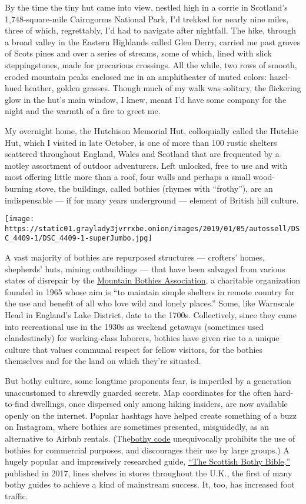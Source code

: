 By the time the tiny hut came into view, nestled high in a corrie in
Scotland's 1,748-square-mile Cairngorms National Park, I'd trekked for
nearly nine miles, three of which, regrettably, I'd had to navigate
after nightfall. The hike, through a broad valley in the Eastern
Highlands called Glen Derry, carried me past groves of Scots pines and
over a series of streams, some of which, lined with slick
steppingstones, made for precarious crossings. All the while, two rows
of smooth, eroded mountain peaks enclosed me in an amphitheater of muted
colors: hazel-hued heather, golden grasses. Though much of my walk was
solitary, the flickering glow in the hut's main window, I knew, meant
I'd have some company for the night and the warmth of a fire to greet
me.

My overnight home, the Hutchison Memorial Hut, colloquially called the
Hutchie Hut, which I visited in late October, is one of more than 100
rustic shelters scattered throughout England, Wales and Scotland that
are frequented by a motley assortment of outdoor adventurers. Left
unlocked, free to use and with most offering little more than a roof,
four walls and perhaps a small wood-burning stove, the buildings, called
bothies (rhymes with ``frothy''), are an indispensable --- if for many
years underground --- element of British hill culture.

\texttt{[image: https://static01.graylady3jvrrxbe.onion/images/2019/01/05/autossell/DSC\_4409-1/DSC\_4409-1-superJumbo.jpg]}

A vast majority of bothies are repurposed structures --- crofters'
homes, shepherds' huts, mining outbuildings --- that have been salvaged
from various states of disrepair by the
\href{https://www.mountainbothies.org.uk/}{Mountain Bothies
Association}, a charitable organization founded in 1965 whose aim is
``to maintain simple shelters in remote country for the use and benefit
of all who love wild and lonely places.'' Some, like Warnscale Head in
England's Lake District, date to the 1700s. Collectively, since they
came into recreational use in the 1930s as weekend getaways (sometimes
used clandestinely) for working-class laborers, bothies have given rise
to a unique culture that values communal respect for fellow visitors,
for the bothies themselves and for the land on which they're situated.

But bothy culture, some longtime proponents fear, is imperiled by a
generation unaccustomed to shrewdly guarded secrets. Map coordinates for
the often hard-to-find dwellings, once dispersed only among hiking
insiders, are now available openly on the internet. Popular hashtags
have helped create something of a buzz on Instagram, where bothies are
sometimes presented, misguidedly, as an alternative to Airbnb rentals.
(The\href{https://www.mountainbothies.org.uk/bothies/bothy-code/}{bothy
code} unequivocally prohibits the use of bothies for commercial
purposes, and discourages their use by large groups.) A hugely popular
and impressively researched guide,
\href{https://thescottishbothybible.com/product/the-scottish-bothy-bible/}{``The
Scottish Bothy Bible,''} published in 2017, lines shelves in stores
throughout the U.K., the first of many bothy guides to achieve a kind of
mainstream success. It, too, has increased foot traffic.

